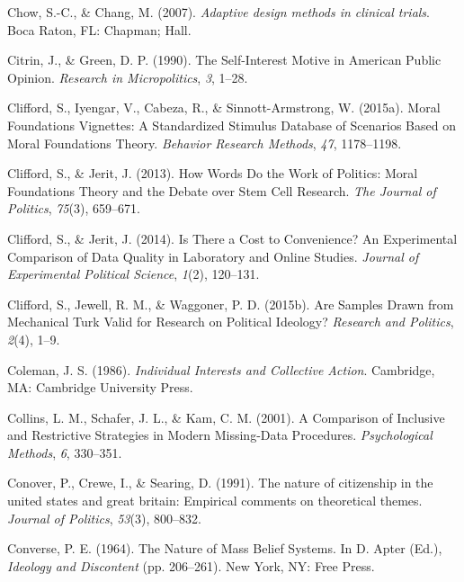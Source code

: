 \documentclass[12pt,econ]{sources/authesis}
\begin{document}
\leavevmode\hypertarget{ref-chow_2007_adaptive}{}%
Chow, S.-C., \& Chang, M. (2007). \emph{Adaptive design methods in clinical trials}. Boca Raton, FL: Chapman; Hall.

\leavevmode\hypertarget{ref-citrin_1990_self-interest}{}%
Citrin, J., \& Green, D. P. (1990). The Self-Interest Motive in American Public Opinion. \emph{Research in Micropolitics}, \emph{3}, 1--28.

\leavevmode\hypertarget{ref-clifford_2015_moral}{}%
Clifford, S., Iyengar, V., Cabeza, R., \& Sinnott-Armstrong, W. (2015a). Moral Foundations Vignettes: A Standardized Stimulus Database of Scenarios Based on Moral Foundations Theory. \emph{Behavior Research Methods}, \emph{47}, 1178--1198.

\leavevmode\hypertarget{ref-clifford_2013_words}{}%
Clifford, S., \& Jerit, J. (2013). How Words Do the Work of Politics: Moral Foundations Theory and the Debate over Stem Cell Research. \emph{The Journal of Politics}, \emph{75}(3), 659--671.

\leavevmode\hypertarget{ref-clifford_2014_there}{}%
Clifford, S., \& Jerit, J. (2014). Is There a Cost to Convenience? An Experimental Comparison of Data Quality in Laboratory and Online Studies. \emph{Journal of Experimental Political Science}, \emph{1}(2), 120--131.

\leavevmode\hypertarget{ref-clifford_2015_samples}{}%
Clifford, S., Jewell, R. M., \& Waggoner, P. D. (2015b). Are Samples Drawn from Mechanical Turk Valid for Research on Political Ideology? \emph{Research and Politics}, \emph{2}(4), 1--9.

\leavevmode\hypertarget{ref-coleman_1986_individual}{}%
Coleman, J. S. (1986). \emph{Individual Interests and Collective Action}. Cambridge, MA: Cambridge University Press.

\leavevmode\hypertarget{ref-collins_2001_comparison}{}%
Collins, L. M., Schafer, J. L., \& Kam, C. M. (2001). A Comparison of Inclusive and Restrictive Strategies in Modern Missing-Data Procedures. \emph{Psychological Methods}, \emph{6}, 330--351.

\leavevmode\hypertarget{ref-conover_1991_nature}{}%
Conover, P., Crewe, I., \& Searing, D. (1991). The nature of citizenship in the united states and great britain: Empirical comments on theoretical themes. \emph{Journal of Politics}, \emph{53}(3), 800--832.

\leavevmode\hypertarget{ref-converse_nature_1964}{}%
Converse, P. E. (1964). The Nature of Mass Belief Systems. In D. Apter (Ed.), \emph{Ideology and Discontent} (pp. 206--261). New York, NY: Free Press.
\end{document}
